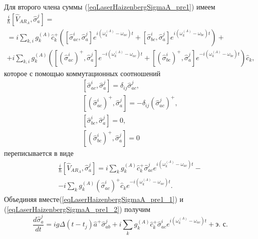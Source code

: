 Для второго члена суммы (\ref{eqLaserHaizenbergSigmaA_pre1}) имеем
\begin{eqnarray}
\frac{i}{\hbar}
\left[\hat{V}_{AR_A}, \hat{\sigma}_a^j\right] = 
\nonumber \\
=
i
\sum_{k,i}
g_k^{(A)}
\hat{c}_k^{+}
 \left(
\left[\hat{\sigma}^{i}_{ac},\hat{\sigma}_a^j\right]  
e^{i\left(\omega_k^{(A)} - \omega_{ac}\right)t}
+ 
\left[\hat{\sigma}^{i}_{bc},\hat{\sigma}_a^j\right]  
e^{i\left(\omega_k^{(A)} - \omega_{bc}\right)t}
\right)
+
\nonumber \\
+
 i
\sum_{k,i}
g_k^{(A)}
 \left(
\left[\left(\hat{\sigma}^{i}_{ac}\right)^{+},\hat{\sigma}_a^j\right]  
e^{-i\left(\omega_k^{(A)} - \omega_{ac}\right)t}
+ 
\left[\left(\hat{\sigma}^{i}_{bc}\right)^{+},\hat{\sigma}_a^j\right]  
e^{-i\left(\omega_k^{(A)} - \omega_{bc}\right)t}
\right)\hat{c}_k,
\nonumber
\end{eqnarray}
которое с помощью коммутационных соотношений
\begin{eqnarray}
\left[\hat{\sigma}^{i}_{ac},\hat{\sigma}_a^j\right] = 
\delta_{ij}\hat{\sigma}^{j}_{ac},
\nonumber \\
\left[\left(\hat{\sigma}^{i}_{ac}\right)^{+},\hat{\sigma}_a^j\right] = 
- \delta_{ij}\left(\hat{\sigma}^{j}_{ac}\right)^{+},
\nonumber \\
\left[\hat{\sigma}^{i}_{bc},\hat{\sigma}_a^j\right] = 0,
\nonumber \\
\left[\left(\hat{\sigma}^{i}_{bc}\right)^{+},\hat{\sigma}_a^j\right] = 0
\label{eqLaserHaizenbergTaskKommutator}
\end{eqnarray}
переписывается в виде
\begin{eqnarray}
\frac{i}{\hbar}
\left[\hat{V}_{AR_A}, \hat{\sigma}_a^j\right] = 
i
\sum_{k}
g_k^{(A)}
\hat{c}_k^{+}\hat{\sigma}^{j}_{ac}  
e^{i\left(\omega_k^{(A)} - \omega_{ac}\right)t}
-
\nonumber \\
- i
\sum_{k}
g_k^{(A)}
\left(\hat{\sigma}^{i}_{ac}\right)^{+} 
\hat{c}_k
e^{-i\left(\omega_k^{(A)} - \omega_{ac}\right)t}.
\label{eqLaserHaizenbergSigmaA_pre1_2}
\end{eqnarray}
Объединяя вместе(\ref{eqLaserHaizenbergSigmaA_pre1_1}) и 
(\ref{eqLaserHaizenbergSigmaA_pre1_2}) получим 
\begin{equation}
\frac{d \hat{\sigma}_a^j}{d t} = 
i g 
\Delta\left(t - t_j\right) 
\hat{a}^{+}\hat{\sigma}^{j}_{ab}  +
i
\sum_{k}
g_k^{(A)}
\hat{c}_k^{+}\hat{\sigma}^{i}_{ac}  
e^{i\left(\omega_k^{(A)} - \omega_{ac}\right)t} + \mbox{э. с.}
\label{eqLaserHaizenbergSigmaA_pre2}
\end{equation}

